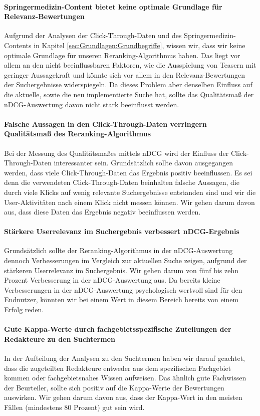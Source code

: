 \paragraph{Springermedizin-Content bietet keine optimale Grundlage für Relevanz-Bewertungen}
Aufgrund der Analysen der Click-Through-Daten und des Springermedizin-Contents in Kapitel \ref{sec:Grundlagen:Grundbegriffe}, wissen wir, dass wir keine optimale Grundlage für unseren Reranking-Algorithmus haben. Das liegt vor allem an den nicht beeinflussbaren Faktoren, wie die Ausspielung von Teasern mit geringer Aussagekraft und könnte sich vor allem in den Relevanz-Bewertungen der Suchergebnisse widerspiegeln. Da dieses Problem aber denselben Einfluss auf die aktuelle, sowie die neu implementierte Suche hat, sollte das Qualitätsmaß der nDCG-Auswertung davon nicht stark beeinflusst werden. 

\paragraph{Falsche Aussagen in den Click-Through-Daten verringern Qualitätsmaß des Reranking-Algorithmus}
Bei der Messung des Qualitätsmaßes mittels nDCG wird der Einfluss der Click-Through-Daten interessanter sein. Grundsätzlich sollte davon ausgegangen werden, dass viele Click-Through-Daten das Ergebnis positiv beeinflussen. Es sei denn die verwendeten Click-Through-Daten beinhalten falsche Aussagen, die durch viele Klicks auf wenig relevante Suchergebnisse entstanden sind und wir die User-Aktivitäten nach einem Klick nicht messen können. Wir gehen darum davon aus, dass diese Daten das Ergebnis negativ beeinflussen werden. 

\paragraph{Stärkere Userrelevanz im Suchergebnis verbessert nDCG-Ergebnis}
Grundsätzlich sollte der Reranking-Algorithmus in der nDCG-Auswertung dennoch Verbesserungen im Vergleich zur aktuellen Suche zeigen, aufgrund der stärkeren Userrelevanz im Suchergebnis. Wir gehen darum von fünf bis zehn Prozent Verbesserung in der nDCG-Auswertung aus. Da bereits kleine Verbesserungen in der nDCG-Auswertung psychologisch wertvoll sind für den Endnutzer, könnten wir bei einem Wert in diesem Bereich bereits von einem Erfolg reden. 

\paragraph{Gute Kappa-Werte durch fachgebietsspezifische Zuteilungen der Redakteure zu den Suchtermen}
In der Aufteilung der Analysen zu den Suchtermen haben wir darauf geachtet, dass die zugeteilten Redakteure entweder aus dem spezifischen Fachgebiet kommen oder fachgebietsnahes Wissen aufweisen. Das ähnlich gute Fachwissen der Beurteiler, sollte sich positiv auf die Kappa-Werte der Bewertungen auswirken. Wir gehen darum davon aus, dass der Kappa-Wert in den meisten Fällen (mindestens 80 Prozent) gut sein wird. 

